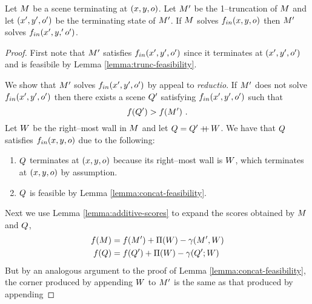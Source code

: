 \begin{theorem}
  \label{thm:substructure}
  Let $\Scene$ be a scene terminating at $(x,y,\WallOrient)$. Let
  $\TruncScene$ be the 1--truncation of $\Scene$ and let
  $(x',y',\WallOrient')$ be the terminating state of
  $\TruncScene$. If $\Scene$ solves $\SubProbIN(x,y,\WallOrient)$
  then $\TruncScene$ solves $\SubProbIN(x',y,'\WallOrient')$.
\end{theorem}
\begin{proof}
  First note that $\TruncScene$ satisfies
  $\SubProbIN(x',y',\WallOrient')$ since it terminates at
  $(x',y',\WallOrient')$ and is feasibile by Lemma
  \ref{lemma:trunc-feasibility}.

  We show that $\TruncScene$ solves $\SubProbIN(x',y',\WallOrient')$
  by appeal to \textit{reductio}. If $\TruncScene$ does not solve
  $\SubProbIN(x',y',\WallOrient')$ then there exists a scene
  $\CfTruncScene$ satisfying $\SubProbIN(x',y',\WallOrient')$ such
  that
  \begin{equation}
    \label{eq:cf-score}
    \Objective(\CfTruncScene) > \Objective(\TruncScene) ~.
  \end{equation}
  Let $\Wall$ be the right--most wall in $\Scene$ and let $\CfScene =
  \CfTruncScene \concat \Wall$. We have that $\CfScene$ satisfies
  $\SubProbIN(x,y,\WallOrient)$ due to the following:
  \begin{enumerate}
    \item{$\CfScene$ terminates at $(x,y,\WallOrient)$ because its
      right--most wall is $\Wall$, which terminates at
      $(x,y,\WallOrient)$ by assumption.}
    \item{$\CfScene$ is feasible by Lemma
      \ref{lemma:concat-feasibility}.}
  \end{enumerate}
  Next we use Lemma \ref{lemma:additive-scores} to expand the scores
  obtained by $\Scene$ and $\CfScene$,
  \begin{equation}
  \begin{split}
    \label{eq:concat-scores}
    \Objective(\Scene) &=
      \Objective(\TruncScene) + \WallPayoff(\Wall) - 
      \CornerPenalty(\TruncScene,\Wall) \\
    \Objective(\CfScene) &=
      \Objective(\CfTruncScene) + \WallPayoff(\Wall) - 
      \CornerPenalty(\CfTruncScene;\Wall)
  \end{split}
  \end{equation}
  But by an analogous argument to the proof of Lemma
  \ref{lemma:concat-feasibility}, the corner produced by appending
  $\Wall$ to $\TruncScene$ is the same as that produced by appending

\end{proof}
